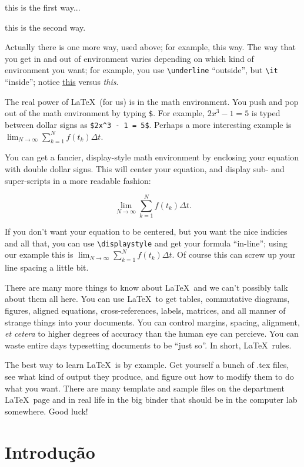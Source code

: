 ﻿\documentclass{article}
\begin{document}
\centerline{this is the first way...}

\begin{center}
	this is the second way.
\end{center}

\noindent Actually there is one more way, used above; for example, 
{\sc this way}.  The way that you get in and out of environment varies
depending on which kind of environment you want; for example, you use 
\verb|\underline| ``outside'', but \verb|\it| ``inside''; 
notice \underline{this} versus {\it this}.

The real power of \LaTeX\ (for us) is in the math environment. You 
push and pop out of the math environment by typing \verb|$|. For 
example, $2x^3 - 1 = 5$ is typed between dollar signs as
\verb|$2x^3 - 1 = 5$|. Perhaps a more interesting example is
$\lim_{N \to \infty} \sum_{k=1}^N f(t_k) \Delta t$.

You can get a fancier, display-style math 
environment by enclosing your equation with double dollar signs.  
This will center your equation, and display sub- and super-scripts in 
a more readable fashion:

$$\lim_{N \to \infty} \sum_{k=1}^N f(t_k) \Delta t.$$

If you don't want your equation to be centered, but you want the nice 
indicies and all that, you can use \verb|\displaystyle| and get your 
formula ``in-line''; using our example this is 
$\displaystyle \lim_{N \to \infty} \sum_{k=1}^N f(t_k) \Delta t.$  Of 
course this can screw up your line spacing a little bit.

There are many more things to know about \LaTeX\ and we can't 
possibly talk about them all here.
You can use \LaTeX\ to get tables, commutative diagrams, figures, 
aligned equations, cross-references, labels, matrices, and all manner 
of strange things into your documents.  You can control margins, 
spacing, alignment, {\it et cetera} to higher degrees of accuracy than 
the human eye can percieve.  You can waste entire days typesetting 
documents to be ``just so''.  In short, \LaTeX\ rules.

The best way to learn \LaTeX\ is by example. Get yourself a bunch
of .tex files, see what kind of output they produce, and figure out how
to modify them to do what you want.  There are many template and 
sample files on the department \LaTeX\ page and in real life in the 
big binder that should be in the computer lab somewhere.  Good luck!

\section{Introdução}
\end{document}
